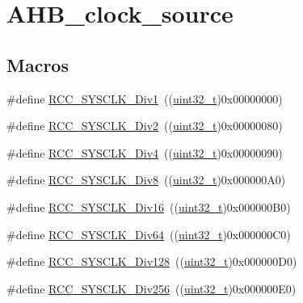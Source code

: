 \hypertarget{group___a_h_b__clock__source}{}\section{A\+H\+B\+\_\+clock\+\_\+source}
\label{group___a_h_b__clock__source}
\subsection*{Macros}
\begin{DoxyCompactItemize}
\item 
\#define \hyperlink{group___a_h_b__clock__source_gadc3ac37d90c2082d640e5948fac0878f}{R\+C\+C\+\_\+\+S\+Y\+S\+C\+L\+K\+\_\+\+Div1}~((\hyperlink{_p_e___types_8h_a33594304e786b158f3fb30289278f5af}{uint32\+\_\+t})0x00000000)
\item 
\#define \hyperlink{group___a_h_b__clock__source_gacadd82156776154a07d128b454fc69fd}{R\+C\+C\+\_\+\+S\+Y\+S\+C\+L\+K\+\_\+\+Div2}~((\hyperlink{_p_e___types_8h_a33594304e786b158f3fb30289278f5af}{uint32\+\_\+t})0x00000080)
\item 
\#define \hyperlink{group___a_h_b__clock__source_ga458f8ae63164e878930dbebd7643f087}{R\+C\+C\+\_\+\+S\+Y\+S\+C\+L\+K\+\_\+\+Div4}~((\hyperlink{_p_e___types_8h_a33594304e786b158f3fb30289278f5af}{uint32\+\_\+t})0x00000090)
\item 
\#define \hyperlink{group___a_h_b__clock__source_gade72fe3aca89f3e8c4fe8692ea217912}{R\+C\+C\+\_\+\+S\+Y\+S\+C\+L\+K\+\_\+\+Div8}~((\hyperlink{_p_e___types_8h_a33594304e786b158f3fb30289278f5af}{uint32\+\_\+t})0x000000\+A0)
\item 
\#define \hyperlink{group___a_h_b__clock__source_gaefd8df4be9c9dbd9cebfb2384933500a}{R\+C\+C\+\_\+\+S\+Y\+S\+C\+L\+K\+\_\+\+Div16}~((\hyperlink{_p_e___types_8h_a33594304e786b158f3fb30289278f5af}{uint32\+\_\+t})0x000000\+B0)
\item 
\#define \hyperlink{group___a_h_b__clock__source_gab6a2c2d4e945c607259988a9b6df26e5}{R\+C\+C\+\_\+\+S\+Y\+S\+C\+L\+K\+\_\+\+Div64}~((\hyperlink{_p_e___types_8h_a33594304e786b158f3fb30289278f5af}{uint32\+\_\+t})0x000000\+C0)
\item 
\#define \hyperlink{group___a_h_b__clock__source_ga1a28926fcb86112058a365e01fe9a46b}{R\+C\+C\+\_\+\+S\+Y\+S\+C\+L\+K\+\_\+\+Div128}~((\hyperlink{_p_e___types_8h_a33594304e786b158f3fb30289278f5af}{uint32\+\_\+t})0x000000\+D0)
\item 
\#define \hyperlink{group___a_h_b__clock__source_gaa28bb876893b3267a813fc98a462d5ee}{R\+C\+C\+\_\+\+S\+Y\+S\+C\+L\+K\+\_\+\+Div256}~((\hyperlink{_p_e___types_8h_a33594304e786b158f3fb30289278f5af}{uint32\+\_\+t})0x000000\+E0)

\end{DoxyCompactItemize}
